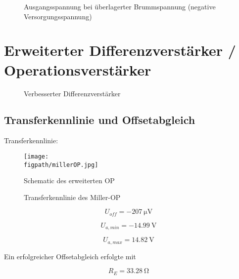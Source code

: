 \begin{figure}[H]
	\centering \small
	\scalebox{0.9}{}
	\caption{Ausgangsspannung bei überlagerter Brummspannung (negative Versorgungsspannung)}
	\label{fig_Kap5_12:Brumm}
\end{figure}


\section{Erweiterter Differenzverstärker / Operationsverstärker}

\begin{figure}[H]
	\centering
	\def\svgwidth{0.9\textwidth}
	
	\caption{Verbesserter Differenzverstärker} 
	\label{fig_Kap5_13:Miller} 
\end{figure}

\subsection{Transferkennlinie und Offsetabgleich}
Transferkennlinie:

\begin{figure}[H]
    \centering
    \texttt{[image: \\figpath/millerOP.jpg]}
    \caption{Schematic des erweiterten OP}
    \label{fig_Kap5_14:SpiceSchematic}
\end{figure}

\begin{figure}[H]
	\centering \small
	\scalebox{0.9}{}
	\caption{Transferkennlinie des Miller-OP}
	\label{fig_Kap5_13:transfer}
\end{figure}

\begin{equation}
    U_{off} = -\SI{207}{\micro\volt}
\end{equation}

\begin{equation}
    U_{a,min} = -\SI{14.99}{\volt}
\end{equation}

\begin{equation}
    U_{a,max} = \SI{14.82}{\volt}
\end{equation}

Ein erfolgreicher Offsetabgleich erfolgte mit 

\begin{equation}
    R_E = \SI{33,28}{\ohm}
\end{equation}

